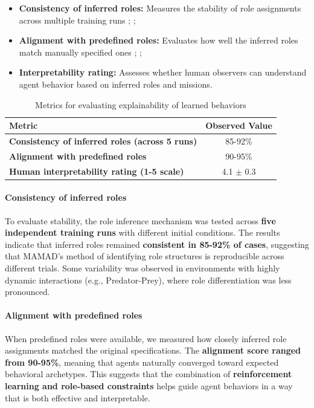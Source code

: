 \documentclass[pdflatex,sn-mathphys-num]{sn-jnl}%
\theoremstyle{thmstyleone}%
\theoremstyle{thmstyletwo}%
\theoremstyle{thmstylethree}%
\begin{document}
\begin{itemize}
    \item \textbf{Consistency of inferred roles:} Measures the stability of role assignments across multiple training runs ; ;
    \item \textbf{Alignment with predefined roles:} Evaluates how well the inferred roles match manually specified ones ; ;
    \item \textbf{Interpretability rating:} Assesses whether human observers can understand agent behavior based on inferred roles and missions.
\end{itemize}

\begin{table}[h!]
    \centering
    \caption{Metrics for evaluating explainability of learned behaviors}
    \begin{tabular}{|l|c|}
        \hline
        \textbf{Metric} & \textbf{Observed Value} \\
        \hline
        \textbf{Consistency of inferred roles (across 5 runs)} & 85-92\% \\
        \hline
        \textbf{Alignment with predefined roles} & 90-95\% \\
        \hline
        \textbf{Human interpretability rating (1-5 scale)} & 4.1 $\pm$ 0.3 \\
        \hline
    \end{tabular}
    \label{tab:explainability}
\end{table}

\paragraph{Consistency of inferred roles} 
To evaluate stability, the role inference mechanism was tested across \textbf{five independent training runs} with different initial conditions. The results indicate that inferred roles remained \textbf{consistent in 85-92\% of cases}, suggesting that MAMAD’s method of identifying role structures is reproducible across different trials. Some variability was observed in environments with highly dynamic interactions (e.g., Predator-Prey), where role differentiation was less pronounced.

\paragraph{Alignment with predefined roles}
When predefined roles were available, we measured how closely inferred role assignments matched the original specifications. The \textbf{alignment score ranged from 90-95\%}, meaning that agents naturally converged toward expected behavioral archetypes. This suggests that the combination of \textbf{reinforcement learning and role-based constraints} helps guide agent behaviors in a way that is both effective and interpretable.
\end{document}
